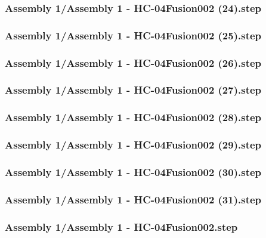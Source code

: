 \documentclass[a4paper,12pt]{article}
\begin{document}
\subsubsection{Assembly 1/Assembly 1 - HC-04Fusion002 (24).step}

\subsubsection{Assembly 1/Assembly 1 - HC-04Fusion002 (25).step}

\subsubsection{Assembly 1/Assembly 1 - HC-04Fusion002 (26).step}

\subsubsection{Assembly 1/Assembly 1 - HC-04Fusion002 (27).step}

\subsubsection{Assembly 1/Assembly 1 - HC-04Fusion002 (28).step}

\subsubsection{Assembly 1/Assembly 1 - HC-04Fusion002 (29).step}

\subsubsection{Assembly 1/Assembly 1 - HC-04Fusion002 (30).step}

\subsubsection{Assembly 1/Assembly 1 - HC-04Fusion002 (31).step}

\subsubsection{Assembly 1/Assembly 1 - HC-04Fusion002.step}

\end{document}
